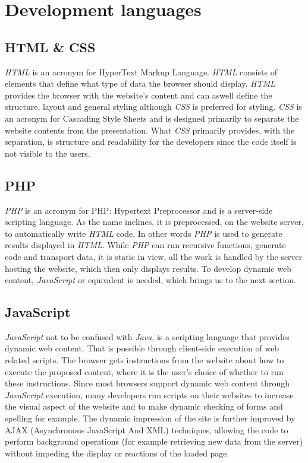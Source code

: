 \section{Development languages}

\subsection{HTML \& CSS}
\textit{HTML} is an acronym for HyperText Markup Language. \textit{HTML} consists of elements that define what type of data the browser should display. \textit{HTML} provides the browser with the website's content and can aswell define the structure, layout and general styling although \textit{CSS} is preferred for styling. \textit{CSS} is an acronym for Cascading Style Sheets and is designed primarily to separate the website contents from the presentation.
What \textit{CSS} primarily provides, with the separation, is structure and readability for the developers since the code itself is not visible to the users.\cite{html}\cite{css}

\subsection{PHP}
\textit{PHP} is an acronym for PHP: Hypertext Preprocessor and is a server-side scripting language. As the name inclines, it is preprocessed, on the website server, to automatically write \textit{HTML} code. In other words \textit{PHP} is used to generate results displayed in \textit{HTML}. While \textit{PHP} can run recursive functions, generate code and transport data, it is static in view, all the work is handled by the server hosting the website, which then only displays results. To develop dynamic web content, \textit{JavaScript} or equivalent is needed, which brings us to the next section.\cite{php}

\subsection{JavaScript}
\textit{JavaScript} not to be confused with \textit{Java}, is a scripting language that provides dynamic web content. That is possible through client-side execution of web related scripts. The browser gets instructions from the website about how to execute the proposed content, where it is the user's choice of whether to run these instructions.
Since most browsers support dynamic web content through \textit{JavaScript} execution, many developers run scripts on their websites to increase the visual aspect of the website and to make dynamic checking of forms and spelling for example.\cite{javascript} The dynamic impression of the site is further improved by AJAX (Asynchronous JavaScript And XML) techniques, allowing the code to perform background operations (for example retrieving new data from the server) without impeding the display or reactions of the loaded page.

